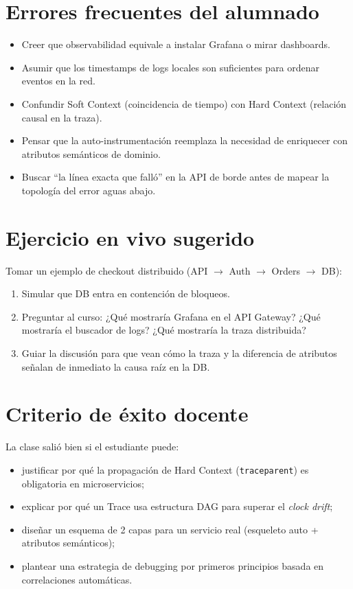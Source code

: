 \documentclass[variant=docente,cover=institutional,mode=screen]{ua-engineering-v6-article}
\begin{document}
\section{Errores frecuentes del alumnado}

\begin{itemize}
\item Creer que observabilidad equivale a instalar Grafana o mirar dashboards.
\item Asumir que los timestamps de logs locales son suficientes para ordenar eventos en la red.
\item Confundir Soft Context (coincidencia de tiempo) con Hard Context (relación causal en la traza).
\item Pensar que la auto-instrumentación reemplaza la necesidad de enriquecer con atributos semánticos de dominio.
\item Buscar ``la línea exacta que falló'' en la API de borde antes de mapear la topología del error aguas abajo.
\end{itemize}

\section{Ejercicio en vivo sugerido}

Tomar un ejemplo de checkout distribuido (API $\rightarrow$ Auth $\rightarrow$ Orders $\rightarrow$ DB):
\begin{enumerate}
\item Simular que DB entra en contención de bloqueos.
\item Preguntar al curso: ¿Qué mostraría Grafana en el API Gateway? ¿Qué mostraría el buscador de logs? ¿Qué mostraría la traza distribuida?
\item Guiar la discusión para que vean cómo la traza y la diferencia de atributos señalan de inmediato la causa raíz en la DB.
\end{enumerate}

\section{Criterio de éxito docente}

La clase salió bien si el estudiante puede:
\begin{itemize}
\item justificar por qué la propagación de Hard Context (\texttt{traceparent}) es obligatoria en microservicios;
\item explicar por qué un Trace usa estructura DAG para superar el \emph{clock drift};
\item diseñar un esquema de 2 capas para un servicio real (esqueleto auto + atributos semánticos);
\item plantear una estrategia de debugging por primeros principios basada en correlaciones automáticas.
\end{itemize}
\end{document}
